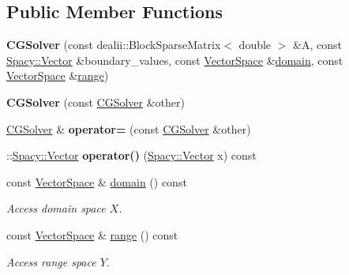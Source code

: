 \subsection*{Public Member Functions}
\begin{DoxyCompactItemize}
\item 
\hypertarget{classSpacy_1_1dealII_1_1CGSolver_a7fb88dbd71bd1d9a875aa32fbc20ca1a}{{\bfseries C\-G\-Solver} (const dealii\-::\-Block\-Sparse\-Matrix$<$ double $>$ \&A, const \hyperlink{classSpacy_1_1Vector}{Spacy\-::\-Vector} \&boundary\-\_\-values, const \hyperlink{classSpacy_1_1VectorSpace}{Vector\-Space} \&\hyperlink{classSpacy_1_1OperatorBase_a2588f9b3e0188820c4c494e63293dc6f}{domain}, const \hyperlink{classSpacy_1_1VectorSpace}{Vector\-Space} \&\hyperlink{classSpacy_1_1OperatorBase_ab19d3b7a6f290b1079248f1e567e53d6}{range})}\label{classSpacy_1_1dealII_1_1CGSolver_a7fb88dbd71bd1d9a875aa32fbc20ca1a}

\item 
\hypertarget{classSpacy_1_1dealII_1_1CGSolver_ad9b75390b2b2deeda4e2372c48739ba1}{{\bfseries C\-G\-Solver} (const \hyperlink{classSpacy_1_1dealII_1_1CGSolver}{C\-G\-Solver} \&other)}\label{classSpacy_1_1dealII_1_1CGSolver_ad9b75390b2b2deeda4e2372c48739ba1}

\item 
\hypertarget{classSpacy_1_1dealII_1_1CGSolver_ad66678932354cb523292c90bb9148464}{\hyperlink{classSpacy_1_1dealII_1_1CGSolver}{C\-G\-Solver} \& {\bfseries operator=} (const \hyperlink{classSpacy_1_1dealII_1_1CGSolver}{C\-G\-Solver} \&other)}\label{classSpacy_1_1dealII_1_1CGSolver_ad66678932354cb523292c90bb9148464}

\item 
\hypertarget{classSpacy_1_1dealII_1_1CGSolver_ae36d85194fbd49f5658eccfada2c3214}{\-::\hyperlink{classSpacy_1_1Vector}{Spacy\-::\-Vector} {\bfseries operator()} (\hyperlink{classSpacy_1_1Vector}{Spacy\-::\-Vector} x) const }\label{classSpacy_1_1dealII_1_1CGSolver_ae36d85194fbd49f5658eccfada2c3214}

\item 
\hypertarget{classSpacy_1_1OperatorBase_a2588f9b3e0188820c4c494e63293dc6f}{const \hyperlink{classSpacy_1_1VectorSpace}{Vector\-Space} \& \hyperlink{classSpacy_1_1OperatorBase_a2588f9b3e0188820c4c494e63293dc6f}{domain} () const }\label{classSpacy_1_1OperatorBase_a2588f9b3e0188820c4c494e63293dc6f}

\begin{DoxyCompactList}\small\item\em Access domain space $X$. \end{DoxyCompactList}\item 
\hypertarget{classSpacy_1_1OperatorBase_ab19d3b7a6f290b1079248f1e567e53d6}{const \hyperlink{classSpacy_1_1VectorSpace}{Vector\-Space} \& \hyperlink{classSpacy_1_1OperatorBase_ab19d3b7a6f290b1079248f1e567e53d6}{range} () const }\label{classSpacy_1_1OperatorBase_ab19d3b7a6f290b1079248f1e567e53d6}

\begin{DoxyCompactList}\small\item\em Access range space $Y$. \end{DoxyCompactList}\end{DoxyCompactItemize}


